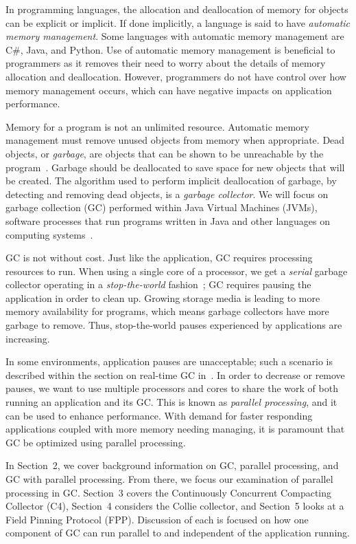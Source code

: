 \documentclass{sig-alternate}
\begin{document}
In programming languages, the allocation and deallocation
of memory for objects can be explicit or implicit. If done implicitly,
a language is said to have \emph{automatic memory management}. Some languages 
with automatic memory management are C\#, Java, and Python.
Use of automatic memory management is beneficial to programmers as it 
removes their need to worry about the details of memory allocation and deallocation. 
However, programmers do not have control over how memory management occurs,
which can have negative impacts on application performance.

Memory for a program is not an unlimited resource. Automatic memory management
must remove unused objects from memory when appropriate.
Dead objects, or \emph{garbage}, are objects that can be shown
to be unreachable by the program~\cite{glossary:g}. Garbage should be deallocated to 
save space for new objects that will be created. The algorithm used to perform implicit
deallocation of garbage, by detecting and removing dead objects, 
is a \emph{garbage collector}.
We will focus on
garbage collection (GC) performed within Java Virtual Machines 
(JVMs), software processes that run programs written in Java and other languages 
on computing systems~\cite{Lindblom:2011}.

GC is not without cost.
Just like the application, GC requires processing resources to run. When using a single core of a processor, 
we get a \emph{serial} garbage collector operating in a 
\emph{stop-the-world} fashion~\cite{Lindblom:2011}; GC requires
pausing the application in order to clean up. 
Growing storage media is leading to more memory
availability for programs, which means garbage collectors
have more garbage to remove. Thus, stop-the-world pauses
experienced by applications are increasing.

In some environments,
application pauses are unacceptable; such a scenario is described within the section on 
real-time GC in~\cite{Lindblom:2011}. In order to decrease or remove 
pauses, we want to use multiple
processors and cores to share the work of both running an application and its GC.
This is known as \emph{parallel processing}, and it can be used
to enhance performance. With
demand for faster responding applications coupled with more memory needing managing,
it is paramount that GC be optimized using parallel processing. 

In Section~2, we cover background information on GC, parallel processing,
and GC with parallel processing.
From there, we focus our examination of parallel processing in GC.
Section~3 covers the Continuously Concurrent Compacting Collector (C4), 
Section~4 considers the Collie collector, and Section~5 looks at a Field Pinning Protocol (FPP).
Discussion of each is focused on how one component of GC can run parallel to
and independent of the application running. 
\end{document}
